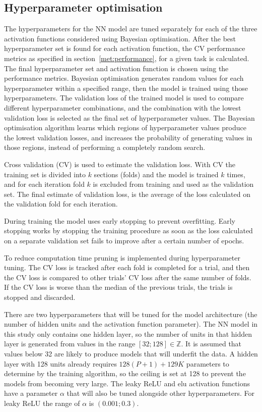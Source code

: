 \documentclass[conference]{IEEEtran}
\begin{document}
	\subsection{Hyperparameter optimisation}
	The hyperparameters for the NN model are tuned separately for each of the three activation functions considered using Bayesian optimisation. After the best hyperparameter set is found for each activation function, the CV performance metrics as specified in section~\ref{met:performance}, for a given task is calculated. The final hyperparameter set and activation function is chosen using the performance metrics. Bayesian optimisation generates random values for each hyperparameter within a specified range, then the model is trained using those hyperparameters. The validation loss of the trained model is used to compare different hyperparameter combinations, and the combination with the lowest validation loss is selected as the final set of hyperparameter values. The Bayesian optimisation algorithm learns which regions of hyperparameter values produce the lowest validation losses, and increases the probability of generating values in those regions, instead of performing a completely random search. 
	
	Cross validation (CV) is used to estimate the validation loss. With CV the training set is divided into $k$ sections (folds) and the model is trained $k$ times, and for each iteration fold $k$ is excluded from training and used as the validation set. The final estimate of validation loss, is the average of the loss calculated on the validation fold for each iteration.
	
	During training the model uses early stopping to prevent overfitting. Early stopping works by stopping the training procedure as soon as the loss calculated on a separate validation set fails to improve after a certain number of epochs.
	
	To reduce computation time pruning is implemented during hyperparameter tuning. The CV loss is tracked after each fold is completed for a trial, and then the CV loss is compared to other trials' CV loss after the same number of folds. If the CV loss is worse than the median of the previous trials, the trials is stopped and discarded.
	
	There are two hyperparameters that will be tuned for the model architecture (the number of hidden units and the activation function parameter). The NN model in this study only contains one hidden layer, so the number of units in that hidden layer is generated from values in the range $[32; 128] \in \mathbb{Z}$. It is assumed that values below 32 are likely to produce models that will underfit the data. A hidden layer with 128 units already requires $128 (P+1) + 129K$ parameters to determine by the training algorithm, so the ceiling is set at 128 to prevent the models from becoming very large. The leaky ReLU and elu activation functions have a parameter $\alpha$ that will also be tuned alongside other hyperparameters. For leaky ReLU the range of $\alpha$ is $(0.001; 0.3)$.
	
\end{document}
